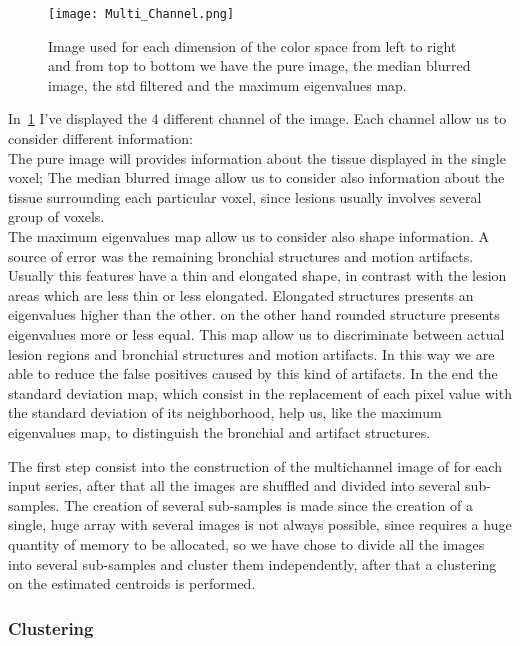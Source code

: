 		\begin{figure}[h]
			\centering
				\texttt{[image: Multi\_Channel.png]}
			\caption{Image used for each dimension of the color space from left to right and from top to bottom we have the pure image, the median blurred image, the std filtered and the maximum eigenvalues map.}\label{fig:MultiChannel}
		\end{figure}
	
		In \figurename\,\ref{fig:MultiChannel} I've displayed the 4 different channel of the image. Each channel allow us to consider different information:\\ 
		The pure image will provides information about the tissue displayed in the single voxel; 
		The median blurred image allow us to consider also information about the tissue surrounding each particular voxel, since lesions usually involves several group of voxels.\\ The maximum eigenvalues map allow us to consider also shape information. A source of error was the remaining bronchial structures and  motion artifacts. Usually this features have a thin and elongated shape, in contrast with the lesion areas which are less thin or less elongated. Elongated structures presents an eigenvalues higher than the other. on the other hand rounded structure presents eigenvalues more or less equal. This map allow us to discriminate between actual lesion regions and bronchial structures and motion artifacts.  In this way we are able to reduce the false positives caused by this kind of artifacts. In the end the standard deviation map, which consist in the replacement of each pixel value with the standard deviation of its neighborhood, help us, like the maximum eigenvalues map, to distinguish the bronchial and artifact structures.
		
		The first step consist into the construction of the multichannel image of for each input series, after that all the images are shuffled and divided into several sub-samples. The creation of several sub-samples is made since the creation of a single, huge array with several images is not always possible, since requires a huge quantity of memory to be allocated, so we have chose to divide all the images into several sub-samples and cluster them independently, after that a clustering on the estimated centroids is performed.\\

		
		\subsubsection*{Clustering} 
		
